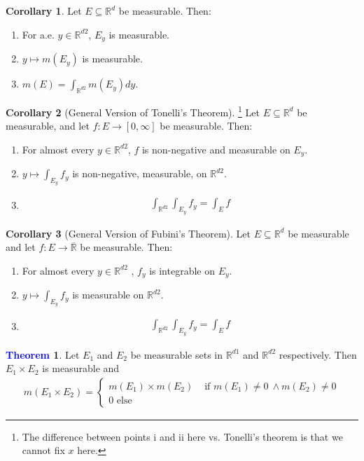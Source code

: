 \documentclass[11pt]{article}
\theoremstyle{definition}
\newcommand{\rd}[0]{\mathbb{R}^d}
\newcommand{\bb}[1]{\mathbb{#1}}
\newtheorem{theorem}{\textcolor{blue}{Theorem}}
\newtheorem{corollary}{Corollary}
\theoremstyle{definition}
\theoremstyle{remark}
\begin{document}
\begin{corollary}
	Let $E \subseteq \rd$ be measurable. Then: 
	\begin{enumerate}[noitemsep]
		\item For a.e. $y \in \bb{R}^{d2}$, $E_y$ is measurable. 
		\item $y \mapsto m(E_y)$ is measurable. 
		\item $m(E) = \int_{\bb{R}^{d2}} m(E_y)dy$. 
	\end{enumerate}
\end{corollary}

\begin{corollary}[General Version of Tonelli's Theorem]\footnote{The difference between points i and ii here vs. Tonelli's theorem is that we cannot fix $x$ here.} Let $E \subseteq \bb{R}^d$ be measurable, and let $f: E \rightarrow [0, \infty]$ be measurable. Then: 
	\begin{enumerate}[noitemsep]
		\item For almost every $y \in \bb{R}^{d2}$, $f$ is non-negative and measurable on $E_y$. 
		\item $y \mapsto \int_{E_y} f_y$ is non-negative, measurable, on $\bb{R}^{d2}$. 
		\item 
		\begin{align*}
		\int_{\bb{R}^{d2}} \int_{E_y} f_y = \int_E f 	
		\end{align*}
	\end{enumerate}
\end{corollary}

\begin{corollary}[General Version of Fubini's Theorem]
	Let $E \subseteq \rd$ be measurable and let $f: E \rightarrow \overline{\bb{R}}$ be measurable. Then: 
	\begin{enumerate}[noitemsep]
		\item For almost every $y \in \bb{R}^{d2}$ , $f_y$ is integrable on $E_y$. 
		\item $y \mapsto \int_{E_y} f_y$ is measurable on $\bb{R}^{d2}$. 
		\item 
		\begin{align*}	
			\int_{\bb{R}^{d2}} \int_{E_y} f_y = \int_E f 	
		\end{align*}
	\end{enumerate}
\end{corollary}

\begin{theorem}
	Let $E_1$ and $E_2$ be measurable sets in $\bb{R}^{d1}$ and $\bb{R}^{d2}$ respectively. Then $E_1 \times E_2$ is measurable and
	\begin{align*}
		m(E_1 \times E_2) = \begin{cases}
			m(E_1) \times m(E_2) & \mbox{ if } m(E_1) \neq 0\ \land m(E_2) \neq 0 \\
			0 \mbox{ else } 
		\end{cases}	
	\end{align*}
\end{theorem}
\end{document}
